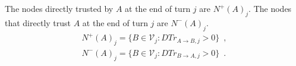 \begin{definition}[Neighbourhood]
  \label{neighbourhood}
  The nodes directly trusted by $A$ at the end of turn $j$ are $N^{+}\left(A\right)_j$. The nodes that directly trust $A$ at
  the end of turn $j$ are $N^{-}\left(A\right)_j$.
    \begin{equation}
    \begin{gathered}
      N^{+}\left(A\right)_j = \{B \in \mathcal{V}_j : DTr_{A \rightarrow B, j} > 0\} \enspace, \\
      N^{-}\left(A\right)_j = \{B \in \mathcal{V}_j : DTr_{B \rightarrow A, j} > 0\} \enspace.
    \end{gathered}
    \end{equation}
\end{definition}
